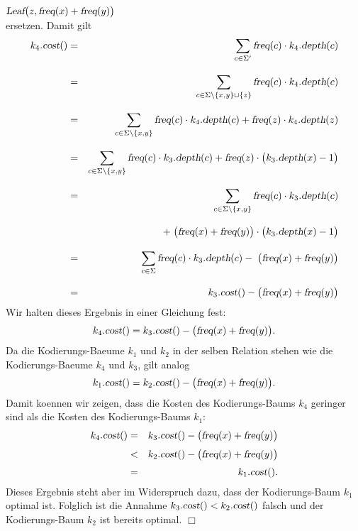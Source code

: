 \begin{enumerate}
  \\[0.2cm]
  \hspace*{1.3cm}
  $\textsl{Leaf}\bigl(z, \textsl{freq}(x) + \textsl{freq}(y)\bigr)$
  \\[0.2cm]
  ersetzen.  Damit gilt
  \begin{eqnarray*}
      k_4.\textsl{cost}() 
  &=& \sum\limits_{c\in\Sigma'} \textsl{freq}(c) \cdot k_4.\textsl{depth}(c) \\[0.3cm]
  &=& \sum\limits_{c\in\Sigma\backslash\{x,y\}\cup\{z\}} \textsl{freq}(c) \cdot k_4.\textsl{depth}(c) 
      \\[0.3cm]
  &=& \sum\limits_{c\in\Sigma\backslash\{x,y\}} \textsl{freq}(c) \cdot k_4.\textsl{depth}(c) 
      +\textsl{freq}(z) \cdot k_4.\textsl{depth}(z) \\[0.3cm]  
  &=& \sum\limits_{c\in\Sigma\backslash\{x,y\}} \textsl{freq}(c) \cdot k_3.\textsl{depth}(c) 
      +\textsl{freq}(z) \cdot \bigl(k_3.\textsl{depth}(x) - 1\bigr) \\[0.3cm]  
  &=& \sum\limits_{c\in\Sigma\backslash\{x,y\}} \textsl{freq}(c) \cdot k_3.\textsl{depth}(c) \\[0.3cm]
  & & +\; \bigl(\textsl{freq}(x) + \textsl{freq}(y)\bigr) \cdot \bigl(k_3.\textsl{depth}(x) - 1\bigr) 
      \\[0.3cm]  
  &=& \sum\limits_{c\in\Sigma} \textsl{freq}(c) \cdot k_3.\textsl{depth}(c) -\; \bigl(\textsl{freq}(x) + \textsl{freq}(y)\bigr)  
      \\[0.3cm]  
  &=& k_3.\textsl{cost}() - \bigl(\textsl{freq}(x) + \textsl{freq}(y)\bigr)  
  \end{eqnarray*}
  Wir halten dieses Ergebnis in einer Gleichung fest:
  \begin{equation}
    \label{eq:huffmanns1}
    k_4.\textsl{cost}() = k_3.\textsl{cost}() - \bigl(\textsl{freq}(x) + \textsl{freq}(y)\bigr).
  \end{equation}
  Da die Kodierungs-Baeume $k_1$ und $k_2$ in der selben Relation stehen wie die Kodierungs-Baeume
  $k_4$ und $k_3$, gilt analog
  \begin{equation}
    \label{eq:huffmanns2}
    k_1.\textsl{cost}() = k_2.\textsl{cost}() - \bigl(\textsl{freq}(x) + \textsl{freq}(y)\bigr). 
  \end{equation}
  Damit koennen wir zeigen, dass die Kosten des Kodierungs-Baums $k_4$ geringer sind als die Kosten
  des Kodierungs-Baums $k_1$:
  \begin{eqnarray*}
         k_4.\textsl{cost}() 
   & = & k_3.\textsl{cost}() - \bigl(\textsl{freq}(x) + \textsl{freq}(y)\bigr) \\[0.1cm]
   & < & k_2.\textsl{cost}() - \bigl(\textsl{freq}(x) + \textsl{freq}(y)\bigr) \\[0.1cm] 
   & = & k_1.\textsl{cost}(). 
  \end{eqnarray*}
  Dieses Ergebnis steht aber im Widerspruch dazu, dass der Kodierungs-Baum $k_1$ 
  optimal ist.  Folglich ist die Annahme $k_3.\textsl{cost}() < k_2.\textsl{cost}()$ falsch und der
  Kodierungs-Baum $k_2$ ist bereits optimal.
  \hspace*{\fill} $\Box$
\end{enumerate}


